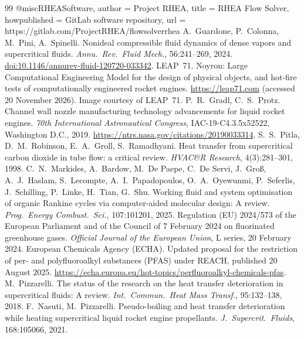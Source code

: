 \documentclass[11pt]{article}
\begin{document}
\begin{thebibliography}{99}\small
{}
@misc{RHEASoftware,
	author       = {{Project RHEA}},
	title        = {{RHEA} Flow Solver},
	howpublished = {GitLab software repository},
	url          = {https://gitlab.com/ProjectRHEA/flowsolverrhea}
}
A.\ Guardone, P.\ Colonna, M.\ Pini, A.\ Spinelli.
Nonideal compressible fluid dynamics of dense vapors and supercritical fluids.
\emph{Annu.\ Rev.\ Fluid Mech.}, 56:241--269, 2024.
\href{https://doi.org/10.1146/annurev-fluid-120720-033342}{doi:10.1146/annurev-fluid-120720-033342}.
 LEAP~71. Noyron: Large Computational Engineering Model for the design of physical objects, and hot-fire tests of computationally engineered rocket engines. \url{https://leap71.com} (accessed 20 November 2026). Image courtesy of LEAP~71.
 P.\ R.\ Gradl, C.\ S.\ Protz. Channel wall nozzle manufacturing technology advancements for liquid rocket engines. \emph{70th International Astronautical Congress}, IAC-19-C4.3.5x52522, Washington D.C., 2019. \url{https://ntrs.nasa.gov/citations/20190033314}.
 S.\ S.\ Pitla, D.\ M.\ Robinson, E.\ A.\ Groll, S.\ Ramadhyani. Heat transfer from supercritical carbon dioxide in tube flow: a critical review. \emph{HVAC\&R Research}, 4(3):281--301, 1998.
 C.\ N.\ Markides, A.\ Bardow, M.\ De Paepe, C.\ De Servi, J.\ Gro\ss, A.\ J.\ Haslam, S.\ Lecompte, A.\ I.\ Papadopoulos, O.\ A.\ Oyewunmi, P.\ Seferlis, J.\ Schilling, P.\ Linke, H.\ Tian, G.\ Shu. Working fluid and system optimisation of organic Rankine cycles via computer-aided molecular design: A review. \emph{Prog.\ Energy Combust.\ Sci.}, 107:101201, 2025.
 Regulation (EU) 2024/573 of the European Parliament and of the Council of 7 February 2024 on fluorinated greenhouse gases. \emph{Official Journal of the European Union}, L series, 20 February 2024.
 European Chemicals Agency (ECHA). Updated proposal for the restriction of per- and polyfluoroalkyl substances (PFAS) under REACH, published 20 August 2025. \url{https://echa.europa.eu/hot-topics/perfluoroalkyl-chemicals-pfas}.
 M.\ Pizzarelli. The status of the research on the heat transfer deterioration in supercritical fluids: A review. \emph{Int.\ Commun.\ Heat Mass Transf.}, 95:132--138, 2018.
 F.\ Nasuti, M.\ Pizzarelli. Pseudo-boiling and heat transfer deterioration while heating supercritical liquid rocket engine propellants. \emph{J.\ Supercrit.\ Fluids}, 168:105066, 2021.

\end{thebibliography}
\end{document}
